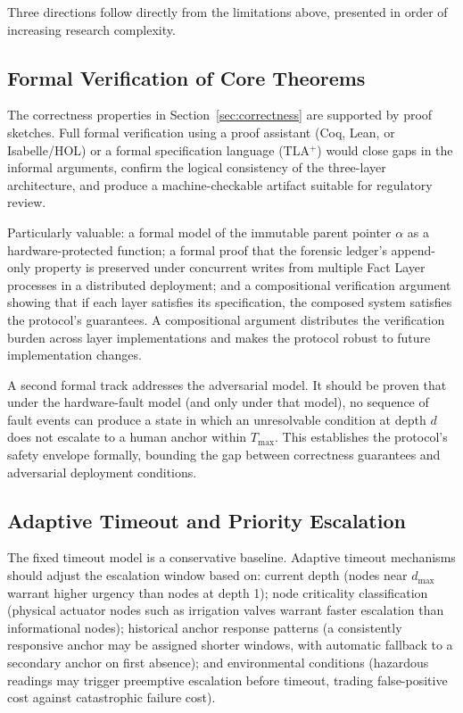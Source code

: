 Three directions follow directly from the limitations above, presented in order of increasing research complexity.

\subsection{Formal Verification of Core Theorems}
\label{sec:future-formal-verification}

The correctness properties in Section~\ref{sec:correctness} are supported by proof sketches. Full formal verification using a proof assistant (Coq, Lean, or Isabelle/HOL) or a formal specification language (TLA$^+$) would close gaps in the informal arguments, confirm the logical consistency of the three-layer architecture, and produce a machine-checkable artifact suitable for regulatory review.

Particularly valuable: a formal model of the immutable parent pointer $\alpha$ as a hardware-protected function; a formal proof that the forensic ledger's append-only property is preserved under concurrent writes from multiple Fact Layer processes in a distributed deployment; and a compositional verification argument showing that if each layer satisfies its specification, the composed system satisfies the protocol's guarantees. A compositional argument distributes the verification burden across layer implementations and makes the protocol robust to future implementation changes.

A second formal track addresses the adversarial model. It should be proven that under the hardware-fault model (and only under that model), no sequence of fault events can produce a state in which an unresolvable condition at depth $d$ does not escalate to a human anchor within $T_{\max}$. This establishes the protocol's safety envelope formally, bounding the gap between correctness guarantees and adversarial deployment conditions.

\subsection{Adaptive Timeout and Priority Escalation}
\label{sec:future-adaptive-timeout}

The fixed timeout model is a conservative baseline. Adaptive timeout mechanisms should adjust the escalation window based on: current depth (nodes near $d_{\max}$ warrant higher urgency than nodes at depth 1); node criticality classification (physical actuator nodes such as irrigation valves warrant faster escalation than informational nodes); historical anchor response patterns (a consistently responsive anchor may be assigned shorter windows, with automatic fallback to a secondary anchor on first absence); and environmental conditions (hazardous readings may trigger preemptive escalation before timeout, trading false-positive cost against catastrophic failure cost).

